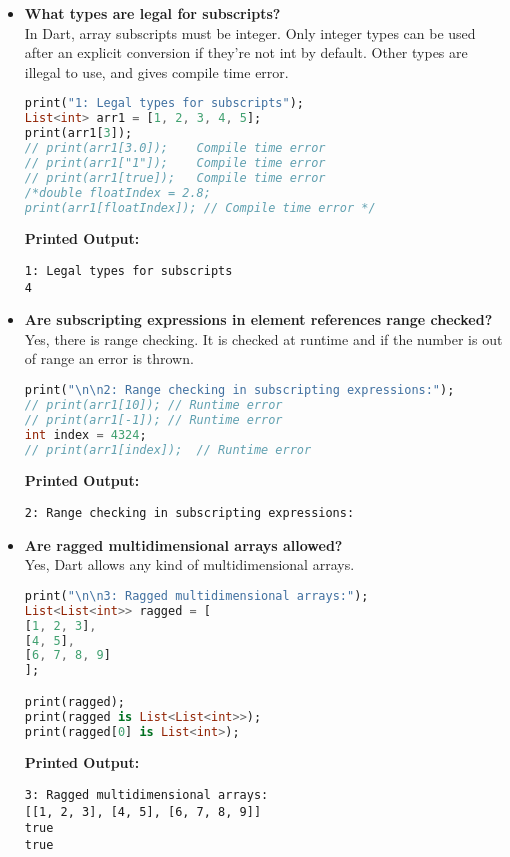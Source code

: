 \documentclass{article}
\begin{document}
\begin{itemize}
\item \textbf{What types are legal for subscripts?} \\
 In Dart, array subscripts must be integer. Only integer types can be used after an explicit conversion if they’re not int by default. Other types are illegal to use, and gives compile time error. 
\begin{lstlisting}[language=Dart]
print("1: Legal types for subscripts");
List<int> arr1 = [1, 2, 3, 4, 5];
print(arr1[3]);
// print(arr1[3.0]);    Compile time error
// print(arr1["1"]);    Compile time error
// print(arr1[true]);   Compile time error         
/*double floatIndex = 2.8;
print(arr1[floatIndex]); // Compile time error */
\end{lstlisting}
\textbf{Printed Output:}
\begin{verbatim}
1: Legal types for subscripts
4
\end{verbatim}
    
    
\item \textbf{Are subscripting expressions in element references range checked?} \\
Yes, there is range checking. It is checked at runtime and if the number is out of range an error is thrown. 
\begin{lstlisting}[language=Dart]
print("\n\n2: Range checking in subscripting expressions:");
// print(arr1[10]); // Runtime error 
// print(arr1[-1]); // Runtime error
int index = 4324;
// print(arr1[index]);  // Runtime error 
\end{lstlisting}
\textbf{Printed Output:}
\begin{verbatim}
2: Range checking in subscripting expressions:
\end{verbatim}

\item \textbf{Are ragged multidimensional arrays allowed?} \\
Yes, Dart allows any kind of multidimensional arrays.
\begin{lstlisting}[language=Dart]
print("\n\n3: Ragged multidimensional arrays:");
List<List<int>> ragged = [
[1, 2, 3],
[4, 5],
[6, 7, 8, 9]
];

print(ragged);
print(ragged is List<List<int>>);
print(ragged[0] is List<int>);
\end{lstlisting}
\textbf{Printed Output:}
\begin{verbatim}
3: Ragged multidimensional arrays:
[[1, 2, 3], [4, 5], [6, 7, 8, 9]]
true
true
\end{verbatim}



\end{itemize}
\end{document}
